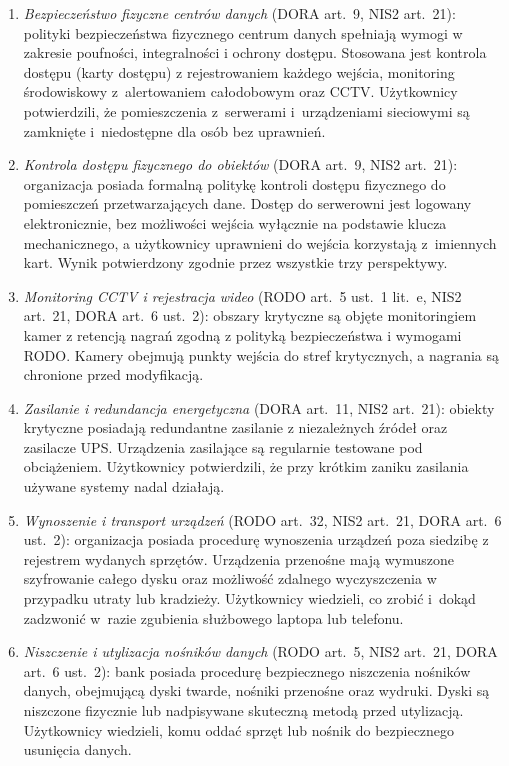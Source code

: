 \begin{enumerate}[label=(\roman*)]
  \item \textit{Bezpieczeństwo fizyczne centrów danych} (DORA art.~9, NIS2 art.~21): polityki bezpieczeństwa fizycznego centrum danych spełniają wymogi w zakresie poufności, integralności i ochrony dostępu. Stosowana jest kontrola dostępu (karty dostępu) z rejestrowaniem każdego wejścia, monitoring środowiskowy z~alertowaniem całodobowym oraz CCTV. Użytkownicy potwierdzili, że pomieszczenia z~serwerami i~urządzeniami sieciowymi są zamknięte i~niedostępne dla osób bez uprawnień.

  \item \textit{Kontrola dostępu fizycznego do obiektów} (DORA art.~9, NIS2 art.~21): organizacja posiada formalną politykę kontroli dostępu fizycznego do pomieszczeń przetwarzających dane. Dostęp do serwerowni jest logowany elektronicznie, bez możliwości wejścia wyłącznie na podstawie klucza mechanicznego, a użytkownicy uprawnieni do wejścia korzystają z~imiennych kart. Wynik potwierdzony zgodnie przez wszystkie trzy perspektywy.

  \item \textit{Monitoring CCTV i rejestracja wideo} (RODO art.~5 ust.~1 lit.~e, NIS2 art.~21, DORA art.~6 ust.~2): obszary krytyczne są objęte monitoringiem kamer z retencją nagrań zgodną z polityką bezpieczeństwa i wymogami RODO. Kamery obejmują punkty wejścia do stref krytycznych, a nagrania są chronione przed modyfikacją.

  \item \textit{Zasilanie i redundancja energetyczna} (DORA art.~11, NIS2 art.~21): obiekty krytyczne posiadają redundantne zasilanie z niezależnych źródeł oraz zasilacze UPS. Urządzenia zasilające są regularnie testowane pod obciążeniem. Użytkownicy potwierdzili, że przy krótkim zaniku zasilania używane systemy nadal działają.

  \item \textit{Wynoszenie i transport urządzeń} (RODO art.~32, NIS2 art.~21, DORA art.~6 ust.~2): organizacja posiada procedurę wynoszenia urządzeń poza siedzibę z rejestrem wydanych sprzętów. Urządzenia przenośne mają wymuszone szyfrowanie całego dysku oraz możliwość zdalnego wyczyszczenia w przypadku utraty lub kradzieży. Użytkownicy wiedzieli, co zrobić i~dokąd zadzwonić w~razie zgubienia służbowego laptopa lub telefonu.

  \item \textit{Niszczenie i utylizacja nośników danych} (RODO art.~5, NIS2 art.~21, DORA art.~6 ust.~2): bank posiada procedurę bezpiecznego niszczenia nośników danych, obejmującą dyski twarde, nośniki przenośne oraz wydruki. Dyski są niszczone fizycznie lub nadpisywane skuteczną metodą przed utylizacją. Użytkownicy wiedzieli, komu oddać sprzęt lub nośnik do bezpiecznego usunięcia danych.


\end{enumerate}
